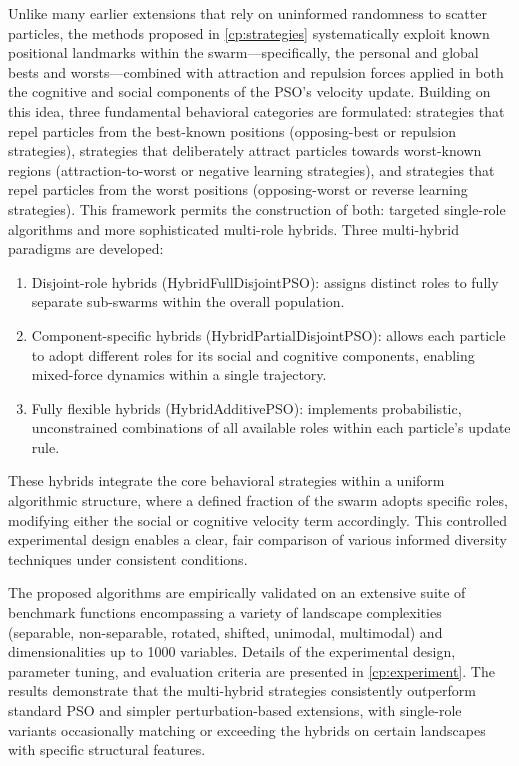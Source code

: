 {Unlike many earlier extensions that rely on uninformed randomness to scatter particles, the methods proposed in \autoref{cp:strategies} systematically exploit known positional landmarks within the swarm---specifically, the personal and global bests and worsts---combined with attraction and repulsion forces applied in both the cognitive and social components of the PSO's velocity update. Building on this idea, three fundamental behavioral categories are formulated: strategies that repel particles from the best-known positions (opposing-best or repulsion strategies), strategies that deliberately attract particles towards worst-known regions (attraction-to-worst or negative learning strategies), and strategies that repel particles from the worst positions (opposing-worst or reverse learning strategies). 
This framework permits the construction of both: targeted single-role algorithms and more sophisticated multi-role hybrids. Three multi-hybrid paradigms are developed:
\begin{enumerate}
    \item Disjoint-role hybrids (HybridFullDisjointPSO): assigns distinct roles to fully separate sub-swarms within the overall population.
    \item Component-specific hybrids (HybridPartialDisjointPSO): allows each particle to adopt different roles for its social and cognitive components, enabling mixed-force dynamics within a single trajectory.
    \item Fully flexible hybrids (HybridAdditivePSO): implements probabilistic, unconstrained combinations of all available roles within each particle’s update rule.
\end{enumerate}
These hybrids integrate the core behavioral strategies within a uniform algorithmic structure, where a defined fraction of the swarm adopts specific roles, modifying either the social or cognitive velocity term accordingly. This controlled experimental design enables a clear, fair comparison of various informed diversity techniques under consistent conditions.

The proposed algorithms are empirically validated on an extensive suite of benchmark functions encompassing a variety of landscape complexities (separable, non-separable, rotated, shifted, unimodal, multimodal) and dimensionalities up to 1000 variables. Details of the experimental design, parameter tuning, and evaluation criteria are presented in \autoref{cp:experiment}.
The results demonstrate that the multi-hybrid strategies consistently outperform standard PSO and simpler perturbation-based extensions, with single-role variants occasionally matching or exceeding the hybrids on certain landscapes with specific structural features.



}